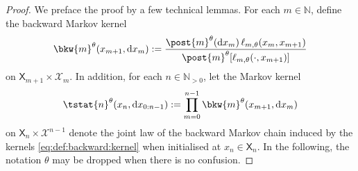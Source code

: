 \documentclass{article}
\newcommand{\Xfd}{\mathcal{X}}
\newcommand{\uksymbol}{\ell}
\newcommand{\ud}[1]{\uksymbol_{#1}}
\newcommand{\nset}{\mathbb{N}}
\newcommand{\nsetpos}{\mathbb{N}_{> 0}}
\newcommand{\1}{\mathbbm{1}}
\newcommand{\Xset}{\mathsf{X}}
\newcommand{\parvec}{\theta}
\newcommand{\hd}[1]{q_{#1}}
\newcommand{\rmd}{\ensuremath{\mathrm{d}}}
\newcommand{\eqdef}{\ensuremath{:=}}
\begin{document}
\begin{proof}
We preface the proof by a few technical lemmas. For each $m \in \nset$, define the  backward Markov kernel 
\begin{equation} \label{eq:def:backward:kernel}
    \bkw{m}^\parvec(x_{m + 1}, \rmd x_m) \eqdef \frac{\post{m}^\parvec(\rmd x_m) \, \ud{m,\parvec}(x_m, x_{m + 1})}{\post{m}^\parvec[\ud{m,\parvec}(\cdot, x_{m + 1})]} %
\end{equation}
on $\Xset_{m + 1} \times \Xfd_m$. In addition, for each $n \in \nsetpos$, let the Markov kernel   
\begin{equation} \label{eq:def:tstat}
\tstat{n}^\parvec(x_n, \rmd x_{0:n - 1}) \eqdef \prod_{m = 0}^{n - 1} \bkw{m}^\parvec(x_{m + 1}, \rmd x_m)
\end{equation}
on $\Xset_n \times \Xfd^{n - 1}$ denote the joint law of the backward Markov chain induced by the kernels \eqref{eq:def:backward:kernel} when initialised at $x_n \in \Xset_n$.   In the following, the notation $\parvec$ may be dropped when there is no confusion.


\end{proof}
\end{document}
